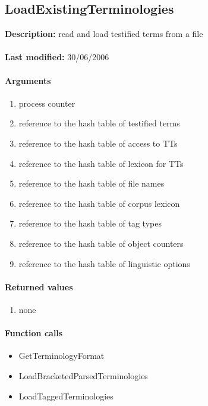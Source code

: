 \subsection{LoadExistingTerminologies}
\textbf{Description:} read and load testified terms from a file\\
\\\textbf{Last modified:} 30/06/2006

\paragraph{Arguments}
\begin{enumerate}
\item process counter
\item reference to the hash table of testified terms
\item reference to the hash table of access to TTs
\item reference to the hash table of lexicon for TTs
\item reference to the hash table of file names
\item reference to the hash table of corpus lexicon
\item reference to the hash table of tag types
\item reference to the hash table of object counters
\item reference to the hash table of linguistic options
\end{enumerate}

\paragraph{Returned values}
\begin{enumerate}
\item none
\end{enumerate}

\paragraph{Function calls}
\begin{itemize}
\item GetTerminologyFormat
\item LoadBracketedParsedTerminologies
\item LoadTaggedTerminologies
\end{itemize}


